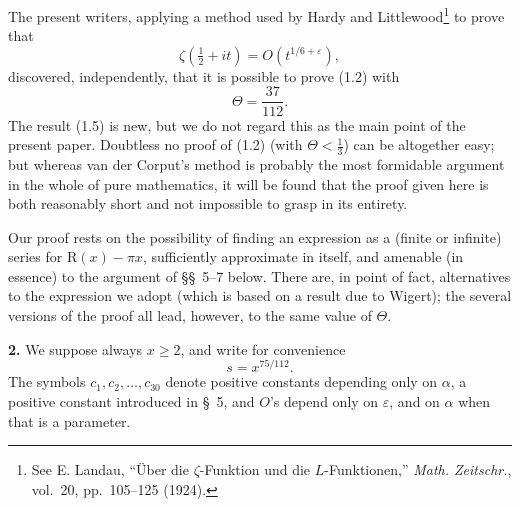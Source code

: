 \documentclass[11pt]{article}
\begin{document}
The present writers, applying a method used by Hardy and
Littlewood\footnote{See E. Landau, ``Über die $\zeta$-Funktion und die
$L$-Funktionen,'' \textit{Math. Zeitschr.}, vol.~20, pp.~105--125 (1924).}
to prove that
\begin{equation}
 \zeta\!\left(\tfrac12+it\right)=O\!\left(t^{1/6+\varepsilon}\right),
 \tag{1.4}
\end{equation}
discovered, independently, that it is possible to prove (1.2) with
\begin{equation}
 \Theta=\frac{37}{112}.
 \tag{1.5}
\end{equation}
The result (1.5) is new, but we do not regard this as the main point of the
present paper. Doubtless no proof of (1.2) (with $\Theta<\tfrac13$) can be
altogether easy; but whereas van der Corput's method is probably the most
formidable argument in the whole of pure mathematics, it will be found that
the proof given here is both reasonably short and not impossible to grasp in
its entirety.

Our proof rests on the possibility of finding an expression as a (finite or
infinite) series for $\mathrm{R}(x)-\pi x$, sufficiently approximate in itself,
and amenable (in essence) to the argument of \S\S~5--7 below. There are, in
point of fact, alternatives to the expression we adopt (which is based on a
result due to Wigert); the several versions of the proof all lead, however,
to the same value of $\Theta$.

\medskip
\noindent\textbf{2.}
We suppose always $x\geq2$, and write for convenience
\[
 s=x^{75/112}.
\]
The symbols $c_1,c_2,\ldots,c_{30}$ denote positive constants depending only
on $\alpha$, a positive constant introduced in \S~5, and $O$'s depend only on
$\varepsilon$, and on $\alpha$ when that is a parameter.
\end{document}
